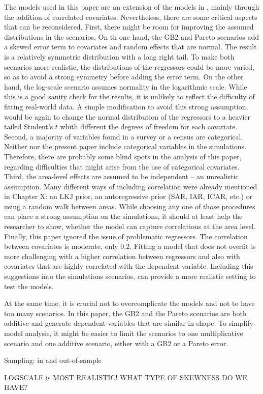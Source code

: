 The models used in this paper are an extension of the models in \cite{rojas_perilla_data_2020}, mainly through the addition of correlated covariates.
Nevertheless, there are some critical aspects that can be reconsidered.
First, there might be room for improving the assumed distributions in the scenarios.
On th one hand, the GB2 and Pareto scenarios add a skewed error term to covariates and random effects that are normal.
The result is a relatively symmetric distribution with a long right tail.
To make both scenarios more realistic, the distributions of the regressors could be more varied, so as to avoid a strong symmetry before adding the error term.
On the other hand, the log-scale scenario assumes normality in the logarithmic scale.
While this is a good sanity check for the results, it is unlikely to reflect the difficulty of fitting real-world data.
A simple modification to avoid this strong assumption, would be again to change the normal distribution of the regressors to a heavier tailed Student's $t$ whith different the degrees of freedom for each covariate.
Second, a majority of variables found in a survey or a census are categorical.
Neither \cite{rojas_perilla_data_2020} nor the present paper include categorical variables in the simulations.
Therefore, there are probably some blind spots in the analysis of this paper, regarding difficulties that might arise from the use of categorical covariates.
Third, the area-level effects are assumed to be independent – an unrealistic assumption.
Many different ways of including correlation were already mentioned in Chapter X: an LKJ prior, an autoregressive prior (SAR, IAR, ICAR, etc.) or using a random walk between areas.
While choosing any one of those procedures can place a strong assumption on the simulations, it should at least help the researcher to show, whether the model can capture correlations at the area level.
Finally, this paper ignored the issue of problematic regressors.
The correlation between covariates is moderate, only 0.2.
Fitting a model that does not overfit is more challenging with a higher correlation between regressors and also with covariates that are highly correlated with the dependent variable.
Including this suggestions into the simulations scenarios, can provide a more realistic setting to test the models.

At the same time, it is crucial not to overcomplicate the models and not to have too many scenarios.
In this paper, the GB2 and the Pareto scenarios are both additive and generate dependent variables that are similar in shape.
To simplify model analysis, it might be easier to limit the scenarios to one multiplicative scenario and one additive scenario, either with a GB2 or a Pareto error.

Sampling: in and out-of-sample

LOGSCALE is MOST REALISTIC! WHAT TYPE OF SKEWNESS DO WE HAVE?